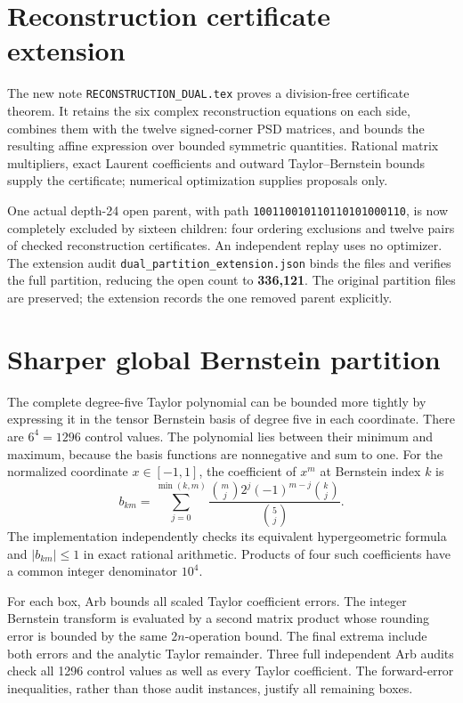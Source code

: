 \documentclass[11pt]{article}
\begin{document}
\section*{Reconstruction certificate extension}
The new note \texttt{RECONSTRUCTION\_DUAL.tex} proves a division-free
certificate theorem. It retains the six complex reconstruction equations
on each side, combines them with the twelve signed-corner PSD matrices,
and bounds the resulting affine expression over bounded symmetric
quantities. Rational matrix multipliers, exact Laurent coefficients and
outward Taylor--Bernstein bounds supply the certificate; numerical
optimization supplies proposals only.

One actual depth-24 open parent, with path
\texttt{100110010110110101000110}, is now completely excluded by
sixteen children: four ordering exclusions and twelve pairs of checked
reconstruction certificates. An independent replay uses no optimizer.
The extension audit \texttt{dual\_partition\_extension.json} binds the
files and verifies the full partition, reducing the open count to
\textbf{336,121}. The original partition files are preserved; the
extension records the one removed parent explicitly.

\section*{Sharper global Bernstein partition}
The complete degree-five Taylor polynomial can be bounded more tightly
by expressing it in the tensor Bernstein basis of degree five in each
coordinate. There are $6^4=1296$ control values. The polynomial lies
between their minimum and maximum, because the basis functions are
nonnegative and sum to one. For the normalized coordinate $x\in[-1,1]$,
the coefficient of $x^m$ at Bernstein index $k$ is
\[
 b_{km}=\sum_{j=0}^{\min(k,m)}
 \frac{\binom mj2^j(-1)^{m-j}\binom kj}{\binom5j}.
\]
The implementation independently checks its equivalent hypergeometric
formula and $|b_{km}|\le1$ in exact rational arithmetic. Products of
four such coefficients have a common integer denominator $10^4$.

For each box, Arb bounds all scaled Taylor coefficient errors. The
integer Bernstein transform is evaluated by a second matrix product
whose rounding error is bounded by the same $2n$-operation bound.
The final extrema include both errors and the analytic Taylor remainder.
Three full independent Arb audits check all 1296 control values as well
as every Taylor coefficient. The forward-error inequalities, rather
than those audit instances, justify all remaining boxes.
\end{document}
